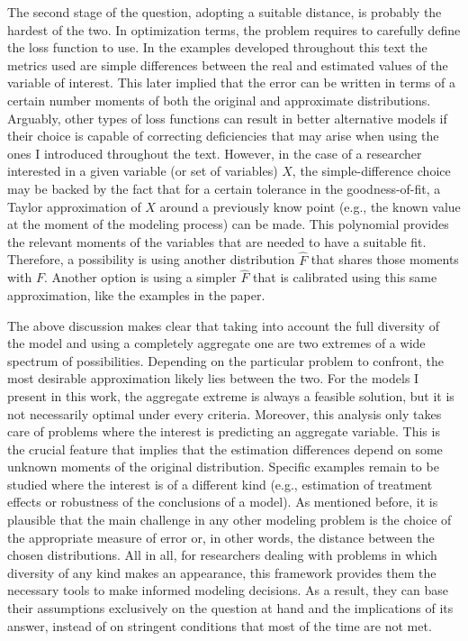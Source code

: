 \documentclass[english, a4paper, 12pt]{article}
\begin{document}
The second stage of the question, adopting a suitable distance, is probably the hardest of the two. In optimization terms, the problem requires to carefully define the loss function to use. In the examples developed throughout this text the metrics used are simple differences between the real and estimated values of the variable of interest. This later implied that the error can be written in terms of a certain number moments of both the original and approximate distributions. Arguably, other types of loss functions can result in better alternative models if their choice is capable of correcting deficiencies that may arise when using the ones I introduced throughout the text. However, in the case of a researcher interested in a given variable (or set of variables) $X$, the simple-difference choice may be backed by the fact that for a certain tolerance in the goodness-of-fit, a Taylor approximation of $X$ around a previously know point (e.g., the known value at the moment of the modeling process) can be made. This polynomial provides the relevant moments of the variables that are needed to have a suitable fit. Therefore, a possibility is using another distribution $\hat{F}$ that shares those moments with $F$. Another option is using a simpler $\hat{F}$ that is calibrated using this same approximation, like the examples in the paper.

The above discussion makes clear that taking into account the full diversity of the model and using a completely aggregate one are two extremes of a wide spectrum of possibilities. Depending on the particular problem to confront, the most desirable approximation likely lies between the two. For the models I present in this work, the aggregate extreme is always a feasible solution, but it is not necessarily optimal under every criteria. Moreover, this analysis only takes care of problems where the interest is predicting an aggregate variable. This is the crucial feature that implies that the estimation differences depend on some unknown moments of the original distribution. Specific examples remain to be studied where the interest is of a different kind (e.g., estimation of treatment effects or robustness of the conclusions of a model). As mentioned before, it is plausible that the main challenge in any other modeling problem is the choice of the appropriate measure of error or, in other words, the distance between the chosen distributions. All in all, for researchers dealing with problems in which diversity of any kind makes an appearance, this framework provides them the necessary tools to make informed modeling decisions. As a result, they can base their assumptions exclusively on the question at hand and the implications of its answer, instead of on stringent conditions that most of the time are not met.
\end{document}
